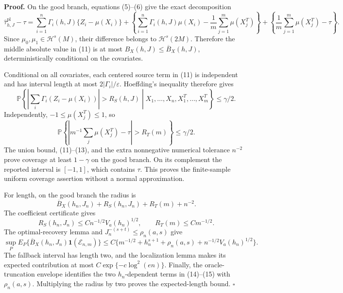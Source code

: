 \textbf{Proof.}
On the good branch, equations (5)--(6) give the exact decomposition
\[
\widehat\tau^{\mathrm{pl}}_{h,J}-\tau
=\sum_{i=1}^n\Gamma_i(h,J)\{Z_i-\mu(X_i)\}
+\left\{\sum_{i=1}^n\Gamma_i(h,J)\mu(X_i)-\frac1m\sum_{j=1}^m\mu(X_j^T)\right\}
+\left\{\frac1m\sum_{j=1}^m\mu(X_j^T)-\tau\right\}.
\tag{11}
\]
Since \(\mu_0,\mu_1\in\mathcal H^s(M)\), their difference belongs to \(\mathcal H^s(2M)\). Therefore the middle absolute value in (11) is at most \(B_X(h,J)\le\overline B_X(h,J)\), deterministically conditional on the covariates.

Conditional on all covariates, each centered source term in (11) is independent and has interval length at most \(2|\Gamma_i|/\varepsilon\). Hoeffding's inequality therefore gives
\[
\mathbb P\left\{\left|\sum_i\Gamma_i(Z_i-\mu(X_i))\right|>R_S(h,J)\middle|X_1,\ldots,X_n,X_1^T,\ldots,X_m^T\right\}\le\gamma/2.
\tag{12}
\]
Independently, \(-1\le\mu(X_j^T)\le1\), so
\[
\mathbb P\left\{\left|m^{-1}\sum_j\mu(X_j^T)-\tau\right|>R_T(m)\right\}\le\gamma/2.
\tag{13}
\]
The union bound, (11)--(13), and the extra nonnegative numerical tolerance \(n^{-2}\) prove coverage at least \(1-\gamma\) on the good branch. On its complement the reported interval is \([-1,1]\), which contains \(\tau\). This proves the finite-sample uniform coverage assertion without a normal approximation.

For length, on the good branch the radius is
\[
\overline B_X(h_n,J_n)+R_S(h_n,J_n)+R_T(m)+n^{-2}.
\]
The coefficient certificate gives
\[
R_S(h_n,J_n)\le Cn^{-1/2}V_a(h_n)^{1/2},
\qquad R_T(m)\le Cm^{-1/2}.
\tag{14}
\]
The optimal-recovery lemma and \(J_n^{-(s+t)}\le\rho_n(a,s)\) give
\[
\sup_P E_P\{\overline B_X(h_n,J_n)\mathbf1(\mathcal E_{n,m})\}
\le C\{m^{-1/2}+h_n^{s+1}+\rho_n(a,s)+n^{-1/2}V_a(h_n)^{1/2}\}.
\tag{15}
\]
The fallback interval has length two, and the localization lemma makes its expected contribution at most \(C\exp\{-c\log^2(en)\}\). Finally, the oracle-truncation envelope identifies the two \(h_n\)-dependent terms in (14)--(15) with \(\rho_n(a,s)\). Multiplying the radius by two proves the expected-length bound. \(\square\)